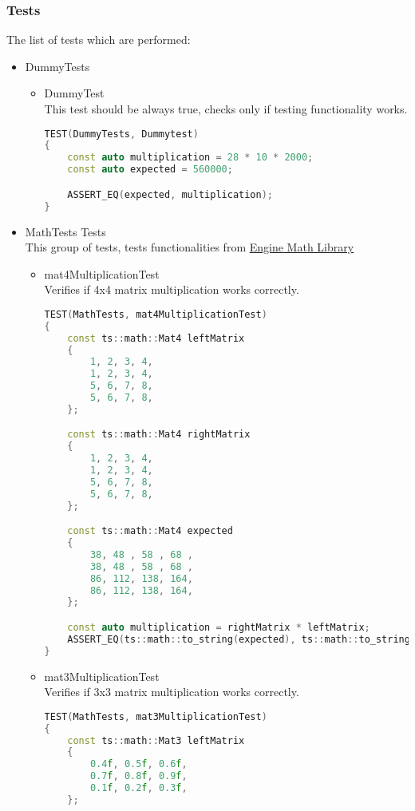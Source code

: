 \subsubsection{Tests}
The list of tests which are performed:
\begin{itemize}
    \item DummyTests
        \begin{itemize}
            \item DummyTest\\
            This test should be always true, checks only if testing functionality works.
\begin{lstlisting}[language=c++, caption=Dummytest test(./engine/tests/tester.cpp)]
TEST(DummyTests, Dummytest)
{
    const auto multiplication = 28 * 10 * 2000;
    const auto expected = 560000;

    ASSERT_EQ(expected, multiplication);
}
\end{lstlisting}
        \end{itemize}
    \item MathTests Tests\\
        This group of tests, tests functionalities from \hyperref[sec:math]{Engine Math Library}
        \begin{itemize}
            \item mat4MultiplicationTest\\
            Verifies if 4x4 matrix multiplication works correctly.
\begin{lstlisting}[language=c++, caption=mat4MultiplicationTest test(./engine/tests/tester.cpp)]
TEST(MathTests, mat4MultiplicationTest)
{
    const ts::math::Mat4 leftMatrix
    {
        1, 2, 3, 4,
        1, 2, 3, 4,
        5, 6, 7, 8,
        5, 6, 7, 8,
    };

    const ts::math::Mat4 rightMatrix
    {
        1, 2, 3, 4,
        1, 2, 3, 4,
        5, 6, 7, 8,
        5, 6, 7, 8,
    };

    const ts::math::Mat4 expected
    {
        38, 48 , 58 , 68 ,
        38, 48 , 58 , 68 ,
        86, 112, 138, 164,
        86, 112, 138, 164,
    };

    const auto multiplication = rightMatrix * leftMatrix;
    ASSERT_EQ(ts::math::to_string(expected), ts::math::to_string(multiplication));
}
\end{lstlisting}
            \item mat3MultiplicationTest\\ Verifies if 3x3 matrix multiplication works correctly.
\begin{lstlisting}[language=c++, caption=mat3MultiplicationTest test(./engine/tests/tester.cpp)]
TEST(MathTests, mat3MultiplicationTest)
{
    const ts::math::Mat3 leftMatrix
    {
        0.4f, 0.5f, 0.6f,
        0.7f, 0.8f, 0.9f,
        0.1f, 0.2f, 0.3f,
    };


\end{lstlisting}
\end{itemize}
\end{itemize}
